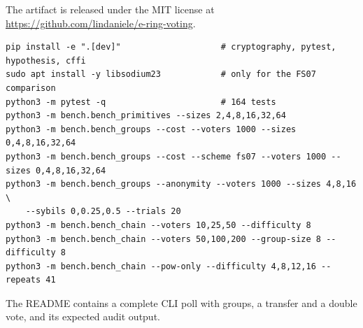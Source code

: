 \documentclass[11pt,a4paper]{article}
\theoremstyle{definition}
\begin{document}
The artifact is released under the MIT license at
\url{https://github.com/lindaniele/e-ring-voting}.
\begin{lstlisting}[style=shell]
pip install -e ".[dev]"                    # cryptography, pytest, hypothesis, cffi
sudo apt install -y libsodium23            # only for the FS07 comparison
python3 -m pytest -q                       # 164 tests
python3 -m bench.bench_primitives --sizes 2,4,8,16,32,64
python3 -m bench.bench_groups --cost --voters 1000 --sizes 0,4,8,16,32,64
python3 -m bench.bench_groups --cost --scheme fs07 --voters 1000 --sizes 0,4,8,16,32,64
python3 -m bench.bench_groups --anonymity --voters 1000 --sizes 4,8,16 \
    --sybils 0,0.25,0.5 --trials 20
python3 -m bench.bench_chain --voters 10,25,50 --difficulty 8
python3 -m bench.bench_chain --voters 50,100,200 --group-size 8 --difficulty 8
python3 -m bench.bench_chain --pow-only --difficulty 4,8,12,16 --repeats 41
\end{lstlisting}
The README contains a complete CLI poll with groups, a transfer and a
double vote, and its expected audit output.
\end{document}
